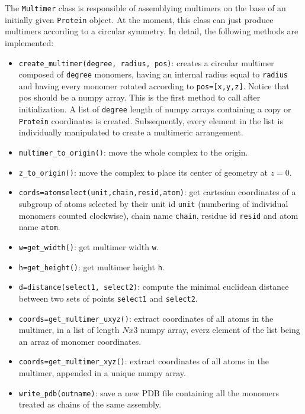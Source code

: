 \documentclass[a4paper, 12pt]{article}
\begin{document}
The \texttt{Multimer} class is responsible of assemblying multimers on the base of an initially given \texttt{Protein} object. At the moment, this class can just produce multimers according to a circular symmetry. In detail, the following methods are implemented:

\begin{itemize}
\item \texttt{create\_multimer(degree, radius, pos)}: creates a circular multimer composed of \texttt{degree} monomers, having an internal radius equal to \texttt{radius} and having every monomer rotated according to \texttt{pos=[x,y,z]}. Notice that pos should be a numpy array. This is the first method to call after initialization. A list of \texttt{degree} length of numpy arrays containing a copy or \texttt{Protein} coordinates is created. Subsequently, every element in the list is individually manipulated to create a multimeric arrangement.
\item \texttt{multimer\_to\_origin()}: move the whole complex to the origin.
\item \texttt{z\_to\_origin()}: move the complex to place its center of geometry at $z=0$.
\item \texttt{cords=atomselect(unit,chain,resid,atom)}: get cartesian coordinates of a subgroup of atoms selected by their unit id \texttt{unit} (numbering of individual monomers counted clockwise), chain name \texttt{chain}, residue id \texttt{resid} and atom name \texttt{atom}.
\item \texttt{w=get\_width()}: get multimer width \texttt{w}.
\item \texttt{h=get\_height()}: get multimer height \texttt{h}.
\item \texttt{d=distance(select1, select2)}: compute the minimal euclidean distance between two sets of points \texttt{select1} and \texttt{select2}.
\item \texttt{coords=get\_multimer\_uxyz()}: extract coordinates of all atoms in the multimer, in a list of length $Nx3$ numpy array, everz element of the list being an arraz of monomer coordinates.
\item \texttt{coords=get\_multimer\_xyz()}: extract coordinates of all atoms in the multimer, appended in a unique numpy array.
\item \texttt{write\_pdb(outname)}: save a new PDB file containing all the monomers treated as chains of the same assembly.

\end{itemize}
\end{document}
